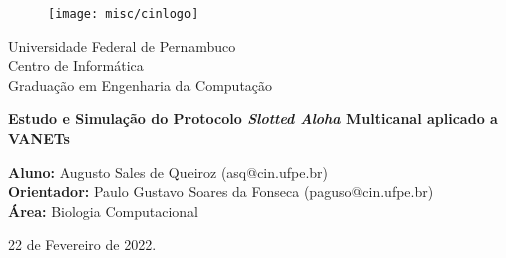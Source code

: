 \begin{figure}[!htpb]
	\centering
	\texttt{[image: misc/cinlogo]}
\end{figure}

\vspace{1cm}
\begin{center}
	{Universidade Federal de Pernambuco\\
	Centro de Informática\\
	Graduação em Engenharia da Computação}
\end{center}
\vspace{2cm}
\begin{center}
	\large{\textbf{Estudo e Simulação do Protocolo \emph{Slotted Aloha} Multicanal aplicado a VANETs}}
\end{center}
\vspace{2.5cm}

\begin{center}
    \textbf{Aluno:} Augusto Sales de Queiroz (asq@cin.ufpe.br) \\
    \leavevmode \newline
    \textbf{Orientador:} Paulo Gustavo Soares da Fonseca (paguso@cin.ufpe.br) \\
    \leavevmode \newline
    \textbf{Área:} Biologia Computacional
\end{center}

\vspace{4cm}
\begin{center}
    22 de Fevereiro de 2022.
\end{center}

\thispagestyle{empty}